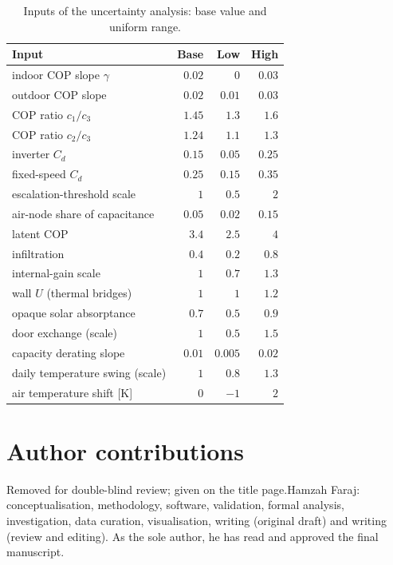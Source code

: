 \documentclass[10pt,a4paper,twocolumn]{article}
\theoremstyle{definition}
\begin{document}
\begin{table}[t]
\centering\footnotesize
\caption{Inputs of the uncertainty analysis: base value and uniform range.}\label{S:tab:uqpar}
\begin{tabularx}{\linewidth}{@{}X r r r@{}}
\toprule
Input & Base & Low & High \\
\midrule
indoor COP slope $\gamma$ & $0.02$ & $0$ & $0.03$ \\
outdoor COP slope & $0.02$ & $0.01$ & $0.03$ \\
COP ratio $c_1/c_3$ & $1.45$ & $1.3$ & $1.6$ \\
COP ratio $c_2/c_3$ & $1.24$ & $1.1$ & $1.3$ \\
inverter $C_d$ & $0.15$ & $0.05$ & $0.25$ \\
fixed-speed $C_d$ & $0.25$ & $0.15$ & $0.35$ \\
escalation-threshold scale & $1$ & $0.5$ & $2$ \\
air-node share of capacitance & $0.05$ & $0.02$ & $0.15$ \\
latent COP & $3.4$ & $2.5$ & $4$ \\
infiltration & $0.4$ & $0.2$ & $0.8$ \\
internal-gain scale & $1$ & $0.7$ & $1.3$ \\
wall $U$ (thermal bridges) & $1$ & $1$ & $1.2$ \\
opaque solar absorptance & $0.7$ & $0.5$ & $0.9$ \\
door exchange (scale) & $1$ & $0.5$ & $1.5$ \\
capacity derating slope & $0.01$ & $0.005$ & $0.02$ \\
daily temperature swing (scale) & $1$ & $0.8$ & $1.3$ \\
air temperature shift [K] & $0$ & $-1$ & $2$ \\
\bottomrule
\end{tabularx}
\end{table}


\section*{Author contributions}
\ifnum{} Removed for double-blind review; given on the title page.\else Hamzah Faraj: conceptualisation, methodology, software, validation, formal analysis, investigation, data curation, visualisation, writing (original draft) and writing (review and editing). As the sole author, he has read and approved the final manuscript.\fi
\end{document}

